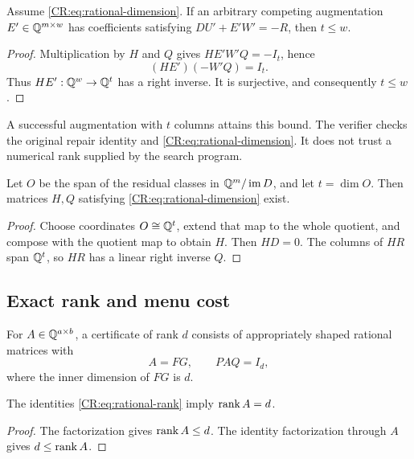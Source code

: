 \begin{CRtheorem}\label{CR:thm:rational-lower}
Assume \eqref{CR:eq:rational-dimension}. If an arbitrary competing augmentation $E'\in\mathbb{Q}^{m\times w}$ has coefficients satisfying $DU'+E'W'=-R$, then $t\leq w$.
\end{CRtheorem}
\begin{proof}
Multiplication by $H$ and $Q$ gives $HE'W'Q=-I_t$, hence
\[
 (HE')(-W'Q)=I_t.
\]
Thus $HE':\mathbb{Q}^w\to\mathbb{Q}^t$ has a right inverse. It is surjective, and consequently $t\leq w$.
\end{proof}

A successful augmentation with $t$ columns attains this bound. The verifier checks the original repair identity and \eqref{CR:eq:rational-dimension}. It does not trust a numerical rank supplied by the search program.

\begin{CRproposition}
Let $O$ be the span of the residual classes in $\mathbb{Q}^m/\operatorname{im} D$, and let $t=\dim O$. Then matrices $H,Q$ satisfying \eqref{CR:eq:rational-dimension} exist.
\end{CRproposition}
\begin{proof}
Choose coordinates $O\cong\mathbb{Q}^t$, extend that map to the whole quotient, and compose with the quotient map to obtain $H$. Then $HD=0$. The columns of $HR$ span $\mathbb{Q}^t$, so $HR$ has a linear right inverse $Q$.
\end{proof}

\subsection{Exact rank and menu cost}
For $A\in\mathbb{Q}^{a\times b}$, a certificate of rank $d$ consists of appropriately shaped rational matrices with
\begin{equation}\label{CR:eq:rational-rank}
 A=FG,\qquad PAQ=I_d,
\end{equation}
where the inner dimension of $FG$ is $d$.

\begin{CRproposition}
The identities \eqref{CR:eq:rational-rank} imply $\operatorname{rank} A=d$.
\end{CRproposition}
\begin{proof}
The factorization gives $\operatorname{rank} A\leq d$. The identity factorization through $A$ gives $d\leq\operatorname{rank} A$.
\end{proof}

